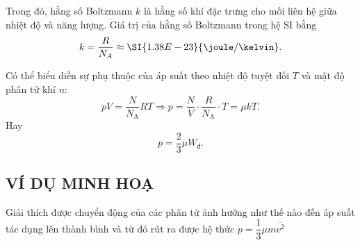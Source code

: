 \begin{tomtat}
\begin{boxdl}
	\end{boxdl}
	\begin{boxdn}
		Trong đó, hằng số Boltzmann $k$ là hằng số khí đặc trưng cho mối liên hệ giữa nhiệt độ và năng lượng. Giá trị của hằng số Boltzmann trong hệ SI bằng
		$$k=\dfrac{R}{N_A}\approx\SI{1.38E-23}{\joule/\kelvin}.$$
	\end{boxdn}
	
	\begin{boxkn}
		Có thể biểu diễn sự phụ thuộc của áp suất theo nhiệt độ tuyệt đối $T$ và mật độ phân tử khí $n$:
		$$pV=\dfrac{N}{N_\text{A}}RT\Rightarrow p=\dfrac{N}{V}\cdot\dfrac{R}{N_\text{A}}\cdot T=\mu kT.$$
		Hay
		$$p=\dfrac{2}{3}\mu W_\text{đ}.$$
	\end{boxkn}
\end{tomtat}
\subsection{VÍ DỤ MINH HOẠ}
\begin{dang}{Giải thích được chuyển động của các phân tử ảnh hưởng như thế nào đến áp suất tác dụng lên thành bình và từ đó rút ra được hệ thức $p=\dfrac{1}{3}\mu m\overline{v^2}$}
	\end{dang}

